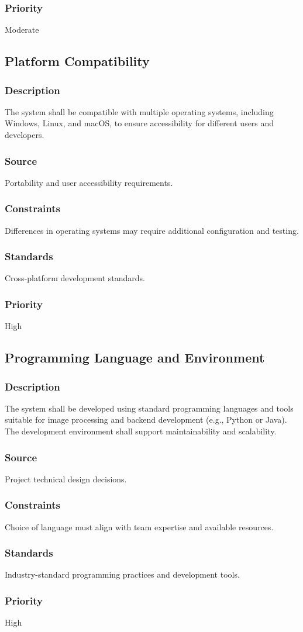 \subsubsection{Priority}
Moderate


\subsection{Platform Compatibility}
\subsubsection{Description}
The system shall be compatible with multiple operating systems, including Windows, Linux, and macOS, to ensure accessibility for different users and developers.

\subsubsection{Source}
Portability and user accessibility requirements.

\subsubsection{Constraints}
Differences in operating systems may require additional configuration and testing.

\subsubsection{Standards}
Cross-platform development standards.

\subsubsection{Priority}
High


\subsection{Programming Language and Environment}
\subsubsection{Description}
The system shall be developed using standard programming languages and tools suitable for image processing and backend development (e.g., Python or Java). The development environment shall support maintainability and scalability.

\subsubsection{Source}
Project technical design decisions.

\subsubsection{Constraints}
Choice of language must align with team expertise and available resources.

\subsubsection{Standards}
Industry-standard programming practices and development tools.

\subsubsection{Priority}
High